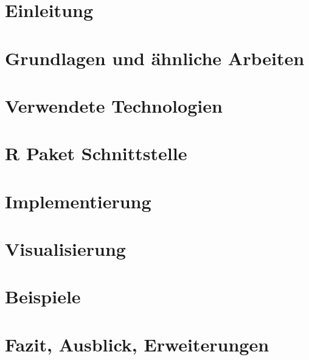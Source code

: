 \chapter{Einleitung}
\label{cha:introduction}


\chapter{Grundlagen und ähnliche Arbeiten}
\label{cha:basics}


\chapter{Verwendete Technologien}
\label{cha:technologies}


\chapter{R Paket Schnittstelle}
\label{cha:interface}


\chapter{Implementierung}
\label{cha:implementation}


\chapter{Visualisierung}
\label{cha:visualization}


\chapter{Beispiele}
\label{cha:examples}


\chapter{Fazit, Ausblick, Erweiterungen}
\label{cha:result}

